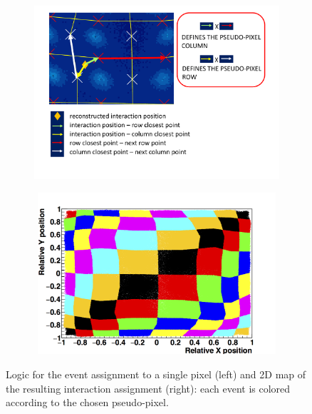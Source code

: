 \begin{figure}
\begin{subfigure}[t]{0.5\textwidth}
\centering
\includegraphics[width=1\textwidth]{03_GraphicFiles/chapter3_CLaRySproto/Absorber/images_charResults_Co60/vector_def.pdf}
\caption{}
\label{chap3::fig::absvectors}
\end{subfigure}
\begin{subfigure}[t]{0.5\textwidth}
\centering
\includegraphics[width=1\textwidth, height = 6cm]{03_GraphicFiles/chapter3_CLaRySproto/Absorber/images_charResults_Na22/3_2PixelAssignment.png}
\caption{}
\label{chap3::fig::abspixAssCheck}
\end{subfigure}
\caption{Logic for the event assignment to a single pixel (left) and 2D map of the resulting interaction assignment (right): each event is colored according to the chosen pseudo-pixel. }
\label{chap3::fig::abspixAssignment}
\end{figure}

